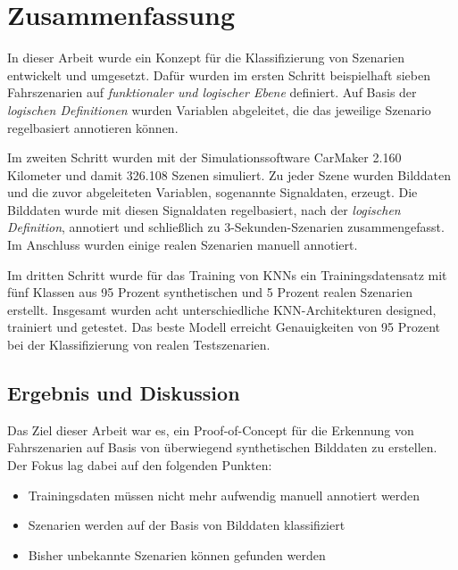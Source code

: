 
\chapter{Zusammenfassung}
\label{zusammenfassung}

In dieser Arbeit wurde ein Konzept für die Klassifizierung von Szenarien entwickelt und umgesetzt. Dafür wurden im ersten Schritt beispielhaft sieben Fahrszenarien auf \textit{funktionaler und logischer Ebene} definiert. Auf Basis der \textit{logischen Definitionen} wurden Variablen abgeleitet, die das jeweilige Szenario regelbasiert annotieren können. 

Im zweiten Schritt wurden mit der Simulationssoftware CarMaker 2.160 Kilometer und damit 326.108 Szenen simuliert. Zu jeder Szene wurden Bilddaten und die zuvor abgeleiteten Variablen, sogenannte Signaldaten, erzeugt. Die Bilddaten wurde mit diesen Signaldaten regelbasiert, nach der \textit{logischen Definition}, annotiert und schließlich zu 3-Sekunden-Szenarien zusammengefasst. Im Anschluss wurden einige realen Szenarien manuell annotiert.

Im dritten Schritt wurde für das Training von \acp{KNN} ein Trainingsdatensatz mit fünf Klassen aus 95 Prozent synthetischen und 5 Prozent realen Szenarien erstellt. Insgesamt wurden acht unterschiedliche \ac{KNN}-Architekturen designed, trainiert und getestet. Das beste Modell erreicht Genauigkeiten von 95 Prozent bei der Klassifizierung von realen Testszenarien.

\section{Ergebnis und Diskussion}
\label{zusammenfassung_ergebnis}

Das Ziel dieser Arbeit war es, ein Proof-of-Concept für die Erkennung von Fahrszenarien auf Basis von überwiegend synthetischen Bilddaten zu erstellen. Der Fokus lag dabei auf den folgenden Punkten:

\begin{itemize}
\item Trainingsdaten müssen nicht mehr aufwendig manuell annotiert werden
\item Szenarien werden auf der Basis von Bilddaten klassifiziert
\item Bisher unbekannte Szenarien können gefunden werden
\end{itemize}

